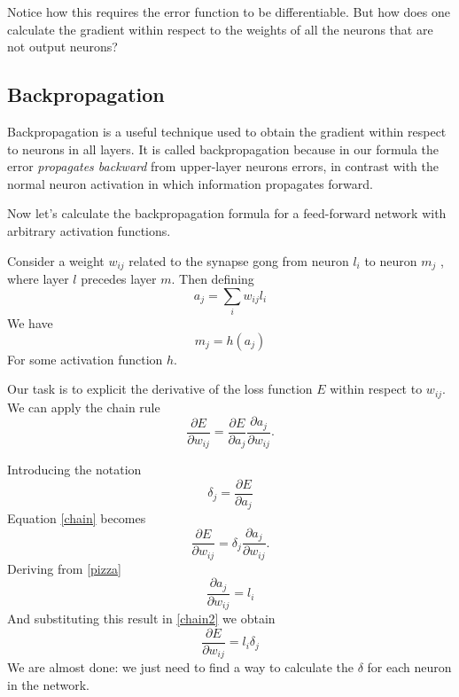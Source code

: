 \documentclass[a4paper]{report}
\begin{document}
Notice how this requires the error function to be differentiable.
But how does one calculate the gradient within respect to the weights of all the neurons that are not output neurons?

\subsection{Backpropagation}
Backpropagation is a useful technique used to obtain the gradient within respect to neurons in all layers.
It is called backpropagation because in our formula the error \textit{propagates backward} from upper-layer neurons errors, in contrast with the normal neuron activation in which information propagates forward.

Now let's calculate the backpropagation formula for a feed-forward network with arbitrary activation functions.

Consider a weight $w_{ij}$ related to the synapse gong from neuron $l_i$ to neuron $m_j$ , where layer $l$ precedes layer $m$.
Then defining
\begin{equation}
a_j = \sum_i w_{ij}l_i
\label{pizza}
\end{equation}
We have
\begin{equation}
m_j = h(a_j)
\label{pizza2}
\end{equation}
For some activation function $h$.

Our task is to explicit the derivative of the loss function $E$ within respect to $w_{ij}$.
We can apply the chain rule
\begin{equation}
\frac{\partial E}{\partial w_{ij}}=\frac{\partial E}{\partial a_j} \frac{\partial a_j}{\partial w_{ij}}.
\label{chain}
\end{equation}

Introducing the notation
\begin{equation}
    \delta_j = \frac{\partial E}{\partial a_j}
    \label{delta}
\end{equation}
Equation \ref{chain} becomes
\begin{equation}
	\frac{\partial E}{\partial w_{ij}} = \delta_j \frac{\partial a_j}{\partial w_{ij}}.
	\label{chain2}
\end{equation}
Deriving from \ref{pizza}
\begin{equation}
\frac{\partial a_j}{\partial w_{ij}} = l_i
\end{equation}
And substituting this result in \ref{chain2} we obtain
\begin{equation}
\frac{\partial E}{\partial w_{ij}}= l_i \delta_j
\end{equation}
We are almost done:
we just need to find a way to calculate the $\delta$ for each neuron in the network.
\end{document}
